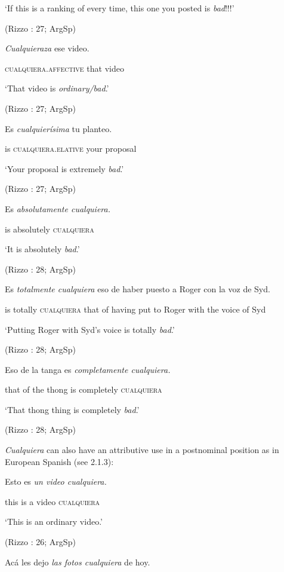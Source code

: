   ‘If this is a ranking of every time, this one you posted is \textit{bad}!!!’

  (Rizzo \citealt{Salierno2013}: 27; ArgSp)

  \textit{Cualquieraza}  ese  video.

  \textsc{cualquiera}.\textsc{affective}  that  video

  ‘That video is \textit{ordinary/bad}.’

  (Rizzo \citealt{Salierno2013}: 27; ArgSp)

  Es  \textit{cualquierísima} tu  planteo.

  is  \textsc{cualquiera}.\textsc{elative}  your  proposal

  ‘Your proposal is extremely \textit{bad}.’

  (Rizzo \citealt{Salierno2013}: 27; ArgSp)

  Es  \textit{absolutamente  cualquiera.} 

  is  absolutely  \textsc{cualquiera}  

  ‘It is absolutely \textit{bad}.’

  (Rizzo \citealt{Salierno2013}: 28; ArgSp)

  Es  \textit{totalmente  cualquiera} eso  de  haber  puesto  a  Roger  con  la voz de Syd.

  is  totally  \textsc{cualquiera} that  of  having  put  to  Roger  with  the voice of Syd

  ‘Putting Roger with Syd’s voice is totally \textit{bad}.’

  (Rizzo \citealt{Salierno2013}: 28; ArgSp)

  Eso  de  la  tanga  es  \textit{completamente  cualquiera.}

  that  of  the  thong  is  completely  \textsc{cualquiera}

  ‘That thong thing is completely \textit{bad}.’

  (Rizzo \citealt{Salierno2013}: 28; ArgSp)

\textit{Cualquiera} can also have an attributive use in a postnominal position as in European Spanish (see 2.1.3):

  Esto  es  \textit{un  video  cualquiera.}

  this  is  a  video  \textsc{cualquiera}

  ‘This is an ordinary video.’

  (Rizzo \citealt{Salierno2013}: 26; ArgSp)

  Acá  les  dejo  \textit{las  fotos  cualquiera} de  hoy.

